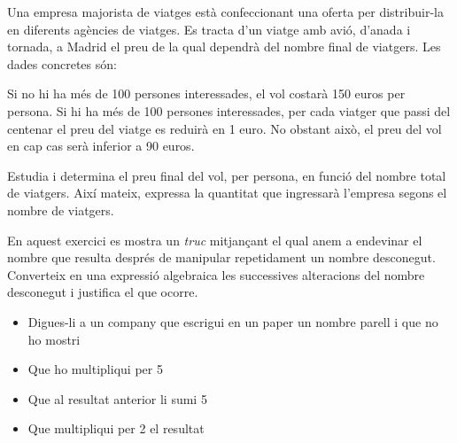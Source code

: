 \pagebreak
\begin{activitats}
	
\begin{mylist}

\exer  Una empresa majorista de viatges està confeccionant una oferta per distribuir-la en diferents agències de viatges. Es tracta d'un viatge amb avió, d'anada i tornada, a Madrid el preu de la qual dependrà del nombre final de viatgers. Les dades concretes són: 

\begin{tasks}
	\task[-]  Si no hi ha més de 100 persones interessades, el vol costarà 150 euros per persona.
	\task[-]  Si hi ha més de 100 persones interessades, per cada viatger que passi del centenar el preu del viatge es reduirà en 1 euro. No obstant això, el preu del vol en cap cas serà inferior a 90 euros.
\end{tasks}
Estudia i determina el preu final del vol, per persona, en funció del nombre total de viatgers. Així mateix, expressa la quantitat que ingressarà l'empresa segons el nombre de viatgers. 


\exer  En aquest exercici es mostra un \textit{truc} mitjançant el qual anem a endevinar el nombre que resulta després de manipular repetidament un nombre desconegut. Converteix en una expressió algebraica les successives alteracions del nombre desconegut i justifica el que ocorre.  
  
  \begin{itemize}
 \item Digues-li a un company que escrigui en un paper un nombre parell i que no ho mostri   

 \item Que ho multipliqui per 5

\item Que al resultat anterior li sumi 5 

\item  Que multipliqui per 2 el resultat


\end{itemize}
\end{mylist}
\end{activitats}
